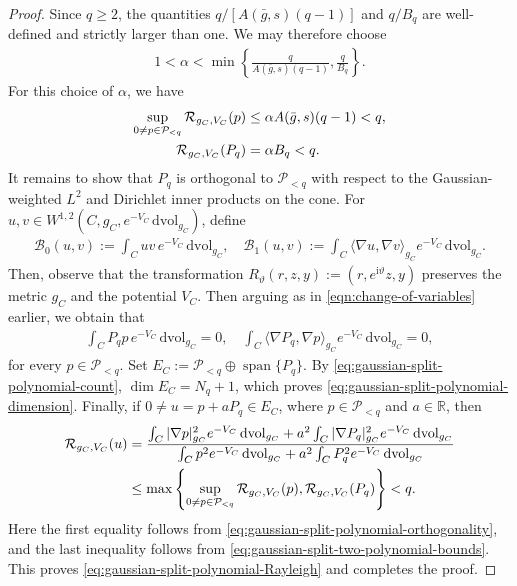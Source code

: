 \documentclass[11pt,reqno]{amsart}
\numberwithin{equation}{section}
\theoremstyle{definition}
\theoremstyle{remark}
\def\cB {\mathcal{B}}
\def\cP {\mathcal{P}}
\def\cR {\mathcal{R}}
\newcommand{\la}{\langle}
\newcommand{\ra}{\rangle}
\newcommand{\spn}{\operatorname{span}}
\newcommand{\iii}{\mathrm i}
\newcommand{\0}{\emptyset}
\newcommand{\bbR}{\mathbb R}
\newcommand{\dvol}{\,\mathrm{dvol}}
\begin{document}
\begin{proof}
Since $q\geq2$, the quantities
$q/[A(\bar g,s)(q-1)]$ and $q/B_q$ are well-defined and strictly larger than
one. We may therefore choose
\begin{align}\label{eq:gaussian-split-alpha-choice}
        1<\alpha<
        \min\left\{
        \frac{q}{A(\bar g,s)(q-1)},
        \frac{q}{B_q}
        \right\}.
\end{align}
For this choice of $\alpha$, we have
\begin{align}\label{eq:gaussian-split-two-polynomial-bounds}
        \sup_{0\neq p\in\cP_{<q}}
        \cR_{g_C,V_C}(p)
        &\leq
        \alpha A(\bar g,s)(q-1)
        <q,\notag\\
        \cR_{g_C,V_C}(P_q)
        &=
        \alpha B_q
        <q.
\end{align}
It remains to show that $P_q$ is orthogonal to $\cP_{<q}$ with respect to the Gaussian-weighted $L^2$ and Dirichlet inner products on the cone. For $u,v \in W^{1,2} \left(C,g_C,e^{-V_C}\dvol_{g_C}\right)$, define
\begin{align}
        \cB_0(u,v)
        :=
        \int_Cuv\,e^{-V_C}\dvol_{g_C},
        \quad 
        \cB_1(u,v)
        :=
        \int_C
        \la\nabla u,\nabla v\ra_{g_C}
        e^{-V_C}\dvol_{g_C}.
\end{align} 
Then, observe that the transformation $R_\vartheta(r,z,y):=(r,e^{\iii\vartheta}z,y)$ preserves the metric $g_C$ and the potential $V_C$. Then arguing as in \eqref{eqn:change-of-variables} earlier, we obtain that
\begin{align}\label{eq:gaussian-split-polynomial-orthogonality}
        \int_CP_qp\,e^{-V_C}\dvol_{g_C}
        =0,\quad 
        \int_C\la\nabla P_q,\nabla p\ra_{g_C}
        e^{-V_C}\dvol_{g_C}
        =0,
\end{align}
for every $p\in \cP_{<q}.$ Set $E_C :=\cP_{<q}\oplus\spn\{P_q\}.$ By \eqref{eq:gaussian-split-polynomial-count}, $\dim E_C=N_q+1$, which proves
\eqref{eq:gaussian-split-polynomial-dimension}. Finally, if
$0\neq u=p+aP_q\in E_C$, where $p\in\cP_{<q}$ and $a\in\bbR$, then
\begin{align}
        \cR_{g_C,V_C}(u)
        &=
        \frac{
        \int_C|\nabla p|_{g_C}^2e^{-V_C}\dvol_{g_C}
        +a^2\int_C|\nabla P_q|_{g_C}^2e^{-V_C}\dvol_{g_C}
        }{
        \int_Cp^2e^{-V_C}\dvol_{g_C}
        +a^2\int_CP_q^2e^{-V_C}\dvol_{g_C}
        }
        \notag\\
        &\leq
        \max\left\{
        \sup_{0\neq p\in\cP_{<q}}\cR_{g_C,V_C}(p),
        \cR_{g_C,V_C}(P_q)
        \right\}
        <q.
\end{align}
Here the first equality follows from
\eqref{eq:gaussian-split-polynomial-orthogonality}, and the last inequality
follows from \eqref{eq:gaussian-split-two-polynomial-bounds}. This proves
\eqref{eq:gaussian-split-polynomial-Rayleigh} and completes the proof.
\end{proof}
\end{document}
